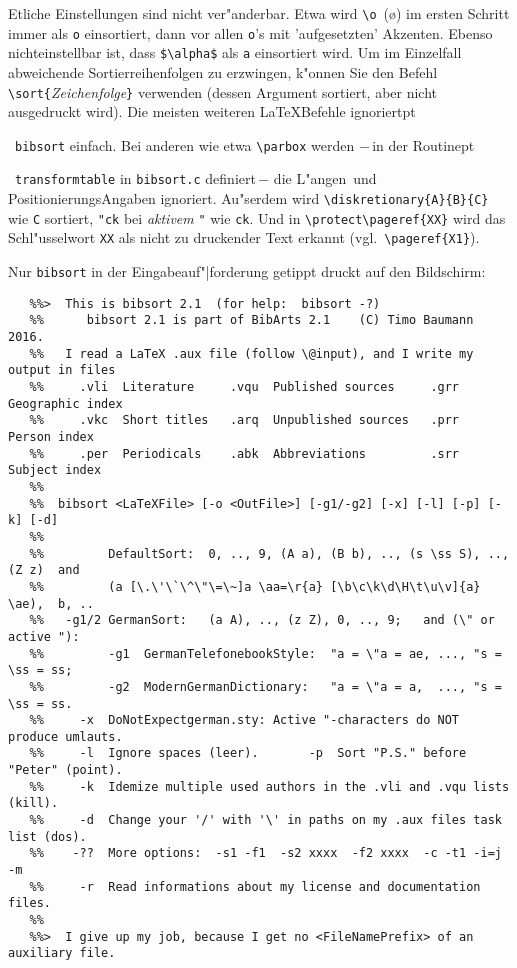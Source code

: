 \documentclass[12pt,a4paper]{article}
\newcommand{\pdfko}[1]{\kern #1pt
                          \strut\ignorespaces}%
\begin{document}
Etliche Einstellungen sind nicht ver"anderbar. Etwa wird \verb|\o|~(\o) im 
ersten Schritt immer als \verb|o| einsortiert, dann vor allen \verb|o|'s mit 
'aufgesetzten' Akzenten. Ebenso nicht\hy einstellbar ist, dass 
\verb|$\alpha$| als \verb|a| einsortiert wird. Um im Einzelfall abweichende 
Sortierreihenfolgen zu erzwingen, k"onnen Sie den \BibArts\hy Befehl 
\verb|\sort{|\textit{Zeichenfolge}\verb|}|  verwenden (dessen Argument
sortiert, aber nicht ausgedruckt wird). Die meisten weiteren \LaTeX\hy Befehle 
ignoriert\pdfko{1}\ 
\verb|bibsort| einfach. Bei anderen wie etwa \verb|\parbox| werden 
$-$\,in der Routine\pdfko{1}\ 
\verb|transformtable| in \verb|bibsort.c| definiert\,$-$ 
die L"angen\hy\ und Positionierungs\hy Angaben ignoriert. Au"serdem wird
\verb|\diskretionary{A}{B}{C}| wie \verb|C| sortiert, \verb|"ck| bei
\textit{aktivem} \verb|"| wie \verb|ck|. Und in
\verb|\protect\pageref{XX}| wird das Schl"usselwort
\verb|XX| als nicht zu druckender Text erkannt (vgl.\ \verb|\pageref{X1}|).

\vspace{.75ex}\noindent
Nur \verb|bibsort| in der Eingabeauf"|forderung getippt druckt auf den Bildschirm: 

{\scriptsize
\begin{verbatim}
   %%>  This is bibsort 2.1  (for help:  bibsort -?)
   %%      bibsort 2.1 is part of BibArts 2.1    (C) Timo Baumann  2016.
   %%   I read a LaTeX .aux file (follow \@input), and I write my output in files
   %%     .vli  Literature     .vqu  Published sources     .grr  Geographic index
   %%     .vkc  Short titles   .arq  Unpublished sources   .prr  Person index
   %%     .per  Periodicals    .abk  Abbreviations         .srr  Subject index
   %%
   %%  bibsort <LaTeXFile> [-o <OutFile>] [-g1/-g2] [-x] [-l] [-p] [-k] [-d]
   %%
   %%         DefaultSort:  0, .., 9, (A a), (B b), .., (s \ss S), .., (Z z)  and
   %%         (a [\.\'\`\^\"\=\~]a \aa=\r{a} [\b\c\k\d\H\t\u\v]{a} \ae),  b, ..
   %%   -g1/2 GermanSort:   (a A), .., (z Z), 0, .., 9;   and (\" or active "):
   %%         -g1  GermanTelefonebookStyle:  "a = \"a = ae, ..., "s = \ss = ss;
   %%         -g2  ModernGermanDictionary:   "a = \"a = a,  ..., "s = \ss = ss.
   %%     -x  DoNotExpectgerman.sty: Active "-characters do NOT produce umlauts.
   %%     -l  Ignore spaces (leer).       -p  Sort "P.S." before "Peter" (point).
   %%     -k  Idemize multiple used authors in the .vli and .vqu lists (kill).
   %%     -d  Change your '/' with '\' in paths on my .aux files task list (dos).
   %%    -??  More options:  -s1 -f1  -s2 xxxx  -f2 xxxx  -c -t1 -i=j -m
   %%     -r  Read informations about my license and documentation files.
   %%
   %%>  I give up my job, because I get no <FileNamePrefix> of an auxiliary file.
\end{verbatim}}
\end{document}
